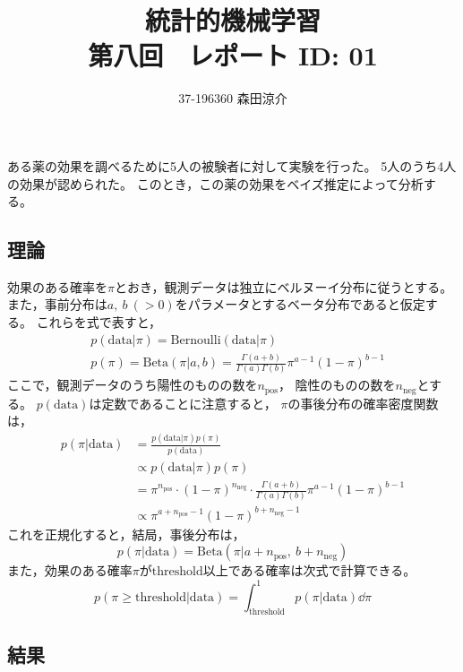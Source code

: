 \documentclass[dvipdfmx, fleqn]{jsarticle}
\title{
	統計的機械学習 \\
	第八回　レポート ID: 01
	}
\author{37-196360 \quad 森田涼介}
\begin{document}
\maketitle


ある薬の効果を調べるために5人の被験者に対して実験を行った。
5人のうち4人の効果が認められた。
このとき，この薬の効果をベイズ推定によって分析する。



\subsection*{理論}

効果のある確率を\(\pi\)とおき，観測データは独立にベルヌーイ分布に従うとする。
また，事前分布は\(a,\ b \ (> 0)\)をパラメータとするベータ分布であると仮定する。
これらを式で表すと，
\begin{align}
    & p(\mathrm{data}|\pi) = \mathrm{Bernoulli}(\mathrm{data}|\pi) \\
    & p(\pi) = \mathrm{Beta}(\pi|a, b)
        = \frac{\Gamma(a+b)}{\Gamma(a) \Gamma(b)} \pi^{a-1} (1-\pi)^{b-1}
\end{align}
ここで，観測データのうち陽性のものの数を\(n_\mathrm{pos}\)，
陰性のものの数を\(n_\mathrm{neg}\)とする。
\(p(\mathrm{data})\)は定数であることに注意すると，
\(\pi\)の事後分布の確率密度関数は，
\begin{align}
    p(\pi | \mathrm{data})
        & = \frac{p(\mathrm{data} | \pi) p(\pi)}{p(\mathrm{data})} \\
        & \propto p(\mathrm{data} | \pi) p(\pi) \\
        & = \pi^{n_\mathrm{pos}} \cdot (1 - \pi)^{n_\mathrm{neg}} \cdot \frac{\Gamma(a+b)}{\Gamma(a) \Gamma(b)} \pi^{a-1} (1-\pi)^{b-1} \\
        & \propto \pi^{a + n_\mathrm{pos} - 1} (1 - \pi)^{b + n_\mathrm{neg} - 1}
\end{align}
これを正規化すると，結局，事後分布は，
\begin{equation}
    p(\pi | \mathrm{data}) = \mathrm{Beta}(\pi | a + n_\mathrm{pos},\ b + n_\mathrm{neg})
\end{equation}
また，効果のある確率\(\pi\)が\(\mathrm{threshold}\)以上である確率は次式で計算できる。
\begin{equation}
    p(\pi \ge \mathrm{threshold} | \mathrm{data}) = \int_{\mathrm{threshold}}^{1} p(\pi | \mathrm{data}) \dd\pi
\end{equation}



\subsection*{結果}
\end{document}
